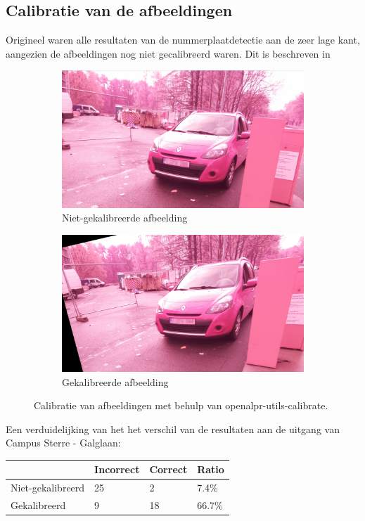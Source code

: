 \subsection{Calibratie van de afbeeldingen}
Origineel waren alle resultaten van de nummerplaatdetectie aan de zeer lage kant, aangezien de afbeeldingen nog niet gecalibreerd waren. Dit is beschreven in 
\begin{figure}[h!]
	\centering
	\begin{subfigure}[b]{0.4\linewidth}
		\includegraphics[width=\linewidth]{img/calibration/pre-calibrate.png}
		\caption{Niet-gekalibreerde afbeelding}
	\end{subfigure}
	\begin{subfigure}[b]{0.4\linewidth}
		\includegraphics[width=\linewidth]{img/calibration/calibrate-cut.png}
		\caption{Gekalibreerde afbeelding}
	\end{subfigure}
	\label{fig:calibration}
	\caption{Calibratie van afbeeldingen met behulp van openalpr-utils-calibrate.}
\end{figure}

Een verduidelijking van het het verschil van de resultaten aan de uitgang van Campus Sterre - Galglaan:
\begin{table}[h!]
	\centering
	\begin{tabular}{l|l|l|l}
		 		& Incorrect & Correct & Ratio	\\ \hline
		Niet-gekalibreerd	& 25 & 2 & 7.4\%	\\
		Gekalibreerd	& 9 & 18 & 66.7\%\\
	\end{tabular}
\end{table}

